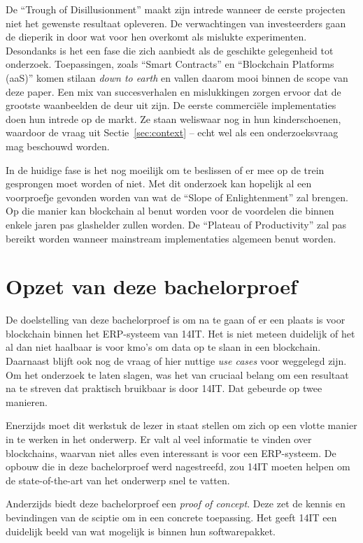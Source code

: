 De ``Trough of Disillusionment'' maakt zijn intrede wanneer de eerste projecten niet het gewenste resultaat opleveren.
De verwachtingen van investeerders gaan de dieperik in door wat voor hen overkomt als mislukte experimenten. Desondanks is het een fase die zich aanbiedt als de geschikte gelegenheid tot onderzoek. Toepassingen, zoals ``Smart Contracts'' en ``Blockchain Platforms (aaS)'' komen stilaan \textit{down to earth} en vallen daarom mooi binnen de scope van deze paper. Een mix van succesverhalen en mislukkingen zorgen ervoor dat de grootste waanbeelden de deur uit zijn. De eerste commerciële implementaties doen hun intrede op de markt. Ze staan weliswaar nog in hun kinderschoenen, waardoor de vraag uit Sectie~\ref{sec:context} --  echt wel als een onderzoeksvraag mag beschouwd worden. 

In de huidige fase is het nog moeilijk om te beslissen of er mee op de trein gesprongen moet worden of niet. Met dit onderzoek kan hopelijk al een voorproefje gevonden worden van wat de ``Slope of Enlightenment'' zal brengen. Op die manier kan blockchain al benut worden voor de voordelen die binnen enkele jaren pas glashelder zullen worden. De ``Plateau of Productivity'' zal pas bereikt worden wanneer mainstream implementaties algemeen benut worden.

\newpage

\section{Opzet van deze bachelorproef}
\label{sec:opzet-van-deze-bachelorproef}


De doelstelling van deze bachelorproef is om na te gaan of er een plaats is voor blockchain binnen het ERP-systeem van 14IT. Het is niet meteen duidelijk of het al dan niet haalbaar is voor kmo's om data op te slaan in een blockchain. Daarnaast blijft ook nog de vraag of hier nuttige \textit{use cases} voor weggelegd zijn. Om het onderzoek te laten slagen, was het van cruciaal belang om een resultaat na te streven dat praktisch bruikbaar is door 14IT. Dat gebeurde op twee manieren. 

Enerzijds moet dit werkstuk de lezer in staat stellen om zich op een vlotte manier in te werken in het onderwerp. Er valt al veel informatie te vinden over blockchains, waarvan niet alles even interessant is voor een ERP-systeem. De opbouw die in deze bachelorproef werd nagestreefd, zou 14IT moeten helpen om de state-of-the-art van het onderwerp snel te vatten.

Anderzijds biedt deze bachelorproef een \textit{proof of concept}. Deze zet de kennis en bevindingen van de sciptie om in een concrete toepassing. Het geeft 14IT een duidelijk beeld van wat mogelijk is binnen hun softwarepakket.

